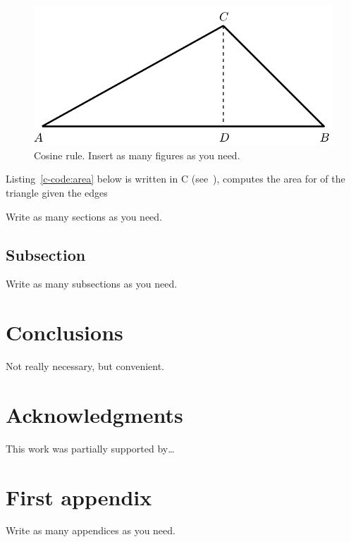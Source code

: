 \documentclass[10pt,twoside]{article}
\theoremstyle{remark}
\theoremstyle{definition}
\begin{document}
\begin{figure}[!h]
\centering
\includegraphics[scale=0.75]{triangle-crop}
\caption{Cosine rule. Insert as many figures as you need.}
\label{fig:triangle}
\end{figure}

\noindent
Listing~\ref{c-code:area} below is written in C (see~\cite{KernighanR88}), computes
the area for of the triangle given the edges
 


\noindent		  
Write as many sections as you need.

\subsection{Subsection}\label{sec:1stSubsectionOf1stSection}
\noindent Write as many subsections as you need.

\section{Conclusions}
Not really necessary, but convenient.

\section*{Acknowledgments}
%
\noindent This work was partially supported by\ldots




\appendix
\section{First appendix}
\noindent Write as many appendices as you need.
\end{document}
